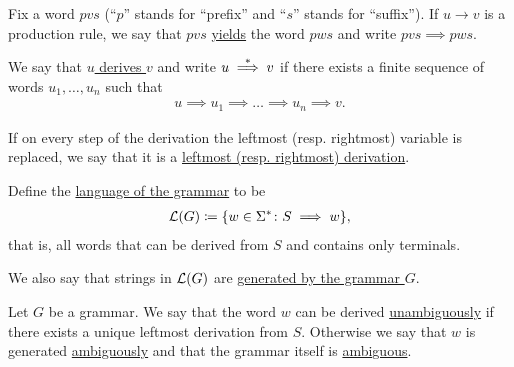 \begin{definition}\label{def:grammar_derivation}\cite[104,108]{Sipser2013}
  Fix a word $pvs$ (\enquote{$p$} stands for \enquote{prefix} and \enquote{$s$} stands for \enquote{suffix}). If $u \to v$ is a production rule, we say that $pvs$ \ul{yields} the word $pws$ and write $pvs \implies pws$.

  We say that \ul{$u$ derives $v$} and write $u \overset * \implies v$ if there exists a finite sequence of words $u_1, \ldots, u_n$ such that
  \begin{align*}
    u \implies u_1 \implies \ldots \implies u_n \implies v.
  \end{align*}

  If on every step of the derivation the leftmost (resp. rightmost) variable is replaced, we say that it is a \ul{leftmost (resp. rightmost) derivation}.

  Define the \ul{language of the grammar} to be
  \begin{align*}
    \mathcal L(G) \coloneqq \{ w \in \Sigma^* \colon S \implies w \},
  \end{align*}
  that is, all words that can be derived from $S$ and contains only terminals.

  We also say that strings in $\mathcal L(G)$ are \ul{generated by the grammar $G$}.
\end{definition}

\begin{definition}\label{def:ambiguous_grammar}\cite[definition 2.7]{Sipser2013}
  Let $G$ be a grammar. We say that the word $w$ can be derived \ul{unambiguously} if there exists a unique leftmost derivation from $S$. Otherwise we say that $w$ is generated \ul{ambiguously} and that the grammar itself is \ul{ambiguous}.
\end{definition}

